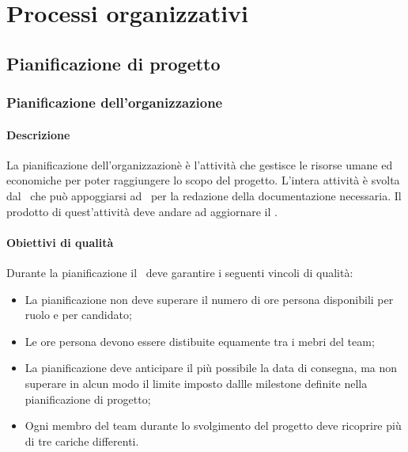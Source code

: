 \documentclass[../NormeDiProgetto_v3.0.0.tex]{subfiles}
\begin{document}
	
\section{Processi organizzativi}
	\subsection{Pianificazione di progetto}
		\subsubsection{Pianificazione dell'organizzazione}
			\paragraph{Descrizione}
				La pianificazione dell'organizzazionè è l'attività che gestisce le risorse umane ed economiche per poter raggiungere lo scopo del progetto.
				L'intera attività è svolta dal \responsabilediprogetto\ che può appoggiarsi ad \amministratori\ per la redazione della documentazione necessaria.
				Il prodotto di quest'attività deve andare ad aggiornare il \pianodiprogetto.
			
			\paragraph{Obiettivi di qualità}
				Durante la pianificazione il \responsabilediprogetto\ deve garantire i seguenti vincoli di qualità: 
				\begin{itemize}
					\item La pianificazione non deve superare il numero di ore persona disponibili per ruolo e per candidato;
					\item Le ore persona devono essere distibuite equamente tra i mebri del team;
					\item La pianificazione deve anticipare il più possibile la data di consegna, ma non superare in alcun modo il limite imposto dallle milestone definite nella pianificazione di progetto;
					\item Ogni membro del team durante lo svolgimento del progetto deve ricoprire più di tre cariche differenti.
				\end{itemize}
	
\end{document}
